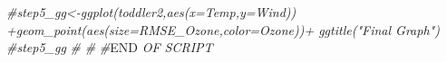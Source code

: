 \documentclass[]{article}
\newenvironment{Shaded}{\begin{snugshade}}{\end{snugshade}}
\newcommand{\CommentTok}[1]{\textcolor[rgb]{0.56,0.35,0.01}{\textit{#1}}}
\newcommand{\RegionMarkerTok}[1]{#1}
\begin{document}
\begin{Shaded}
\begin{Highlighting}[]
\CommentTok{#step5_gg<-ggplot(toddler2,aes(x=Temp,y=Wind)) +geom_point(aes(size=RMSE_Ozone,color=Ozone))+ ggtitle("Final Graph")}
\CommentTok{#step5_gg}
\CommentTok{#}
\CommentTok{#}
\CommentTok{#}\RegionMarkerTok{END}\CommentTok{ OF SCRIPT}
\end{Highlighting}
\end{Shaded}
\end{document}
